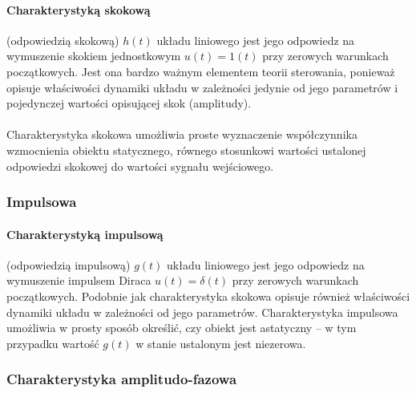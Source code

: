 \documentclass[a4paper,twoside]{report}
\begin{document}
\paragraph{Charakterystyką skokową} (odpowiedzią skokową) $h(t)$ układu liniowego jest
jego odpowiedz na wymuszenie skokiem jednostkowym $u(t) = 1(t)$ przy
zerowych warunkach początkowych. Jest ona bardzo ważnym elementem teorii
sterowania, ponieważ opisuje właściwości dynamiki układu w zależności
jedynie od jego parametrów i pojedynczej wartości opisującej skok (amplitudy).\\\\
Charakterystyka skokowa umożliwia proste wyznaczenie współczynnika
		wzmocnienia obiektu statycznego, równego stosunkowi wartości ustalonej
		odpowiedzi skokowej do wartości sygnału wejściowego.
		
\subsubsection{Impulsowa}
\paragraph{Charakterystyką impulsową} (odpowiedzią impulsową) $g(t)$ układu liniowego
jest jego odpowiedz na wymuszenie impulsem Diraca $u(t)=\delta(t) $ przy zerowych
warunkach początkowych. Podobnie jak charakterystyka skokowa opisuje
również właściwości dynamiki układu w zależności od jego parametrów.
Charakterystyka impulsowa umożliwia w prosty sposób określić, czy obiekt jest
astatyczny – w tym przypadku wartość $g(t)$ w stanie ustalonym jest niezerowa.

\subsubsection{Charakterystyka amplitudo-fazowa}
\end{document}
